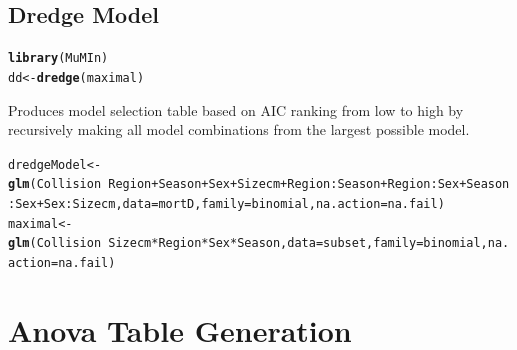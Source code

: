 \documentclass{article}\usepackage[]{graphicx}\usepackage[]{color}
\makeatletter
\newcommand{\hlopt}[1]{\textcolor[rgb]{0,0,0}{#1}}%
\newcommand{\hlstd}[1]{\textcolor[rgb]{0.345,0.345,0.345}{#1}}%
\newcommand{\hlkwb}[1]{\textcolor[rgb]{0.69,0.353,0.396}{#1}}%
\newcommand{\hlkwc}[1]{\textcolor[rgb]{0.333,0.667,0.333}{#1}}%
\newcommand{\hlkwd}[1]{\textcolor[rgb]{0.737,0.353,0.396}{\textbf{#1}}}%
\newenvironment{kframe}{%
 \def\at@end@of@kframe{}%
 \ifinner\ifhmode%
  \def\at@end@of@kframe{\end{minipage}}%
  \begin{minipage}{\columnwidth}%
 \fi\fi%
 \def\FrameCommand##1{\hskip\@totalleftmargin \hskip-\fboxsep
 \colorbox{shadecolor}{##1}\hskip-\fboxsep
     \hskip-\linewidth \hskip-\@totalleftmargin \hskip\columnwidth}%
 \MakeFramed {\advance\hsize-\width
   \@totalleftmargin\z@ \linewidth\hsize
   \@setminipage}}%
 {\par\unskip\endMakeFramed%
 \at@end@of@kframe}
\newenvironment{knitrout}{}{} %
\makeatother
\begin{document}
\subsection*{Dredge Model}
\begin{knitrout}
\color{fgcolor}\begin{kframe}
\begin{alltt}
\hlkwd{library}\hlstd{(MuMIn)}
\hlstd{dd} \hlkwb{<-} \hlkwd{dredge}\hlstd{(maximal)}
\end{alltt}


{\ttfamily\noindent\itshape{}}\end{kframe}
\end{knitrout}
Produces model selection table based on AIC ranking from low to high by recursively making all model combinations from the largest possible model. 
\begin{knitrout}
\color{fgcolor}\begin{kframe}
\begin{alltt}
\hlstd{dredgeModel} \hlkwb{<-} \hlkwd{glm}\hlstd{(Collision} \hlopt{~} \hlstd{Region} \hlopt{+} \hlstd{Season} \hlopt{+} \hlstd{Sex} \hlopt{+} \hlstd{Sizecm} \hlopt{+} \hlstd{Region}\hlopt{:}\hlstd{Season} \hlopt{+} \hlstd{Region}\hlopt{:}\hlstd{Sex} \hlopt{+} \hlstd{Season}\hlopt{:}\hlstd{Sex} \hlopt{+} \hlstd{Sex}\hlopt{:}\hlstd{Sizecm,} \hlkwc{data} \hlstd{= mortD,} \hlkwc{family} \hlstd{= binomial,} \hlkwc{na.action} \hlstd{= na.fail)}
\hlstd{maximal} \hlkwb{<-} \hlkwd{glm}\hlstd{(Collision} \hlopt{~} \hlstd{Sizecm}\hlopt{*}\hlstd{Region}\hlopt{*}\hlstd{Sex}\hlopt{*}\hlstd{Season,} \hlkwc{data} \hlstd{= subset,} \hlkwc{family} \hlstd{= binomial,} \hlkwc{na.action} \hlstd{= na.fail)}
\end{alltt}
\end{kframe}
\end{knitrout}
\section*{Anova Table Generation}
\end{document}

